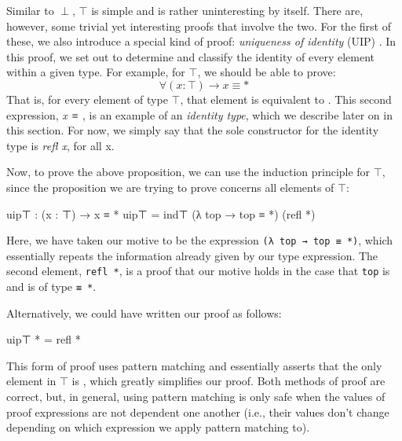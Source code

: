 \documentclass[12pt]{article}
\begin{document}
Similar to \(\perp\), \(\top\) is simple and is rather uninteresting by itself.
There are, however, some trivial yet interesting proofs that involve the two.
For the first of these, we also introduce a special kind of proof: {\it uniqueness
of identity} (UIP) \cite{}. In this proof, we set out to determine and classify
the identity of every element within a given type. For example, for \(\top\), we
should be able to prove:
$$\forall (x : \top) \rightarrow x ≡ *$$
That is, for every element of type \(\top\), that element is equivalent to {\tt *}.
This second expression, {\it x ≡} {\tt *}, is an example of an {\it identity type},
which we describe later on in this section. For now, we simply say that the
sole constructor for the identity type is {\it refl x}, for all x.

Now, to prove the above proposition, we can use the induction principle for
\(\top\), since the proposition we are trying to prove concerns all elements
of \(\top\):
\begin{center}
\begin{minipage}{0.9\textwidth}
\begin{code}
uip⊤ : (x : ⊤) → x ≡ *
uip⊤ = ind⊤ (λ top → top ≡ *) (refl *)
\end{code}
\end{minipage}
\end{center}
Here, we have taken our motive to be the expression {\tt (λ top → top ≡ *)},
which essentially repeats the information already given by our type expression.
The second element, {\tt refl *}, is a proof that our motive holds in the case that
{\tt top} is {\tt *} and is of type {\tt * ≡ *}.

Alternatively, we could have written our proof as follows:
\begin{center}
\begin{minipage}{0.9\textwidth}
\begin{code}
uip⊤ * = refl *
\end{code}
\end{minipage}
\end{center}
This form of proof uses pattern matching and essentially asserts that the only
element in \(\top\) is {\tt *}, which greatly simplifies our proof. Both methods
of proof are correct, but, in general, using pattern matching is only safe when
the values of proof expressions are not dependent one another (i.e., their
values don't change depending on which expression we apply pattern matching to).
\end{document}
